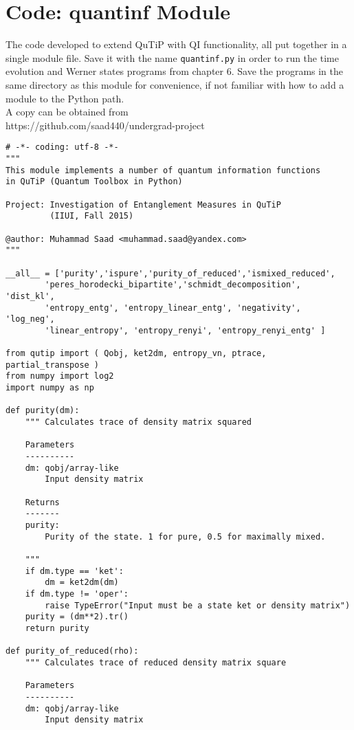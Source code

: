 \chapter{Code: quantinf Module}

The code developed to extend QuTiP with QI functionality, all put together in a single module file. Save it with the name \texttt{quantinf.py} in order to run the time evolution and Werner states programs from chapter 6. Save the programs in the same directory as this module for convenience, if not familiar with how to add a module to the Python path.\\
A copy can be obtained from\\
https://github.com/saad440/undergrad-project \\

\begin{verbatim}
# -*- coding: utf-8 -*-
"""
This module implements a number of quantum information functions
in QuTiP (Quantum Toolbox in Python)

Project: Investigation of Entanglement Measures in QuTiP
         (IIUI, Fall 2015)

@author: Muhammad Saad <muhammad.saad@yandex.com>
"""

__all__ = ['purity','ispure','purity_of_reduced','ismixed_reduced',
        'peres_horodecki_bipartite','schmidt_decomposition', 'dist_kl',
        'entropy_entg', 'entropy_linear_entg', 'negativity', 'log_neg',
        'linear_entropy', 'entropy_renyi', 'entropy_renyi_entg' ]

from qutip import ( Qobj, ket2dm, entropy_vn, ptrace, partial_transpose )
from numpy import log2
import numpy as np

def purity(dm):
    """ Calculates trace of density matrix squared
    
    Parameters
    ----------
    dm: qobj/array-like
        Input density matrix
    
    Returns
    -------
    purity:
        Purity of the state. 1 for pure, 0.5 for maximally mixed.
    
    """
    if dm.type == 'ket':
        dm = ket2dm(dm)
    if dm.type != 'oper':
        raise TypeError("Input must be a state ket or density matrix")
    purity = (dm**2).tr()
    return purity

def purity_of_reduced(rho):
    """ Calculates trace of reduced density matrix square
    
    Parameters
    ----------
    dm: qobj/array-like
        Input density matrix
    

\end{verbatim}
